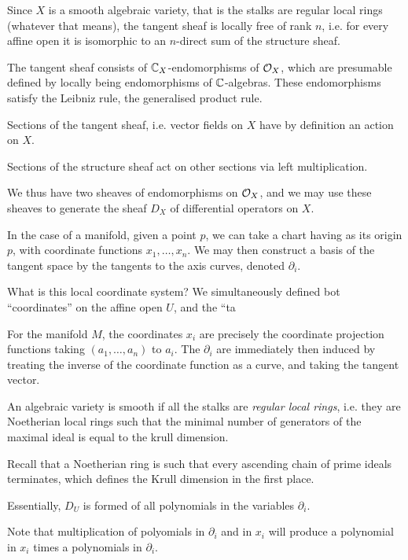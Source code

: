 \documentclass[a4paper]{article}
\begin{document}
\maketitle
Since $X$ is a smooth algebraic variety, that is the stalks are regular local rings (whatever that means), the tangent sheaf is locally free of rank $n$, i.e. for every affine open it is isomorphic to an $n$-direct sum of the structure sheaf.

The tangent sheaf consists of $\mathbb{C}_X$-endomorphisms of $\mathcal{O}_X$, which are presumable defined by locally being endomorphisms of $\mathbb{C}$-algebras. These endomorphisms satisfy the Leibniz rule, the generalised product rule.

Sections of the tangent sheaf, i.e. vector fields on $X$ have by definition an action on $X$.

Sections of the structure sheaf act on other sections via left multiplication.

We thus have two sheaves of endomorphisms on $\mathcal{O}_X$, and we may use these sheaves to generate the sheaf $D_X$ of differential operators on $X$.

In the case of a manifold, given a point $p$, we can take a chart having as its origin $p$, with coordinate functions $x_1,\dots,x_n$. We may then construct a basis of the tangent space by the tangents to the axis curves, denoted $\partial_i$.

What is this local coordinate system? We simultaneously defined bot ``coordinates'' on the affine open $U$, and the ``ta

For the manifold $M$, the coordinates $x_i$ are precisely the coordinate projection functions taking $(a_1,\dots,a_n)$ to $a_i$. The $\partial_i$ are immediately then induced by treating the inverse of the coordinate function as a curve, and taking the tangent vector.

An algebraic variety is smooth if all the stalks are \emph{regular local rings}, i.e. they are Noetherian local rings such that the minimal number of generators of the maximal ideal is equal to the krull dimension.

Recall that a Noetherian ring is such that every ascending chain of prime ideals terminates, which defines the Krull dimension in the first place.

Essentially, $D_U$ is formed of all polynomials in the variables $\partial_i$.

Note that multiplication of polyomials in $\partial_i$ and in $x_i$ will produce a polynomial in $x_i$ times a polynomials in $\partial_i$.
\end{document}
